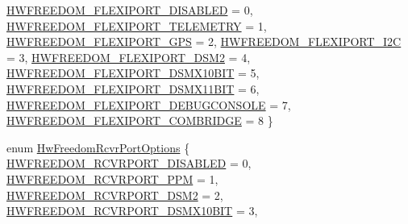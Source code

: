 \begin{DoxyCompactItemize}
\hyperlink{group___hw_freedom_gga2869a644abdac09041a699813c2d8b09a059273b4c9c6fab451bcdbe4fcef17fd}{\-H\-W\-F\-R\-E\-E\-D\-O\-M\-\_\-\-F\-L\-E\-X\-I\-P\-O\-R\-T\-\_\-\-D\-I\-S\-A\-B\-L\-E\-D} = 0, 
\hyperlink{group___hw_freedom_gga2869a644abdac09041a699813c2d8b09ae4f26a63e2e69003aa18fdfd7e00c142}{\-H\-W\-F\-R\-E\-E\-D\-O\-M\-\_\-\-F\-L\-E\-X\-I\-P\-O\-R\-T\-\_\-\-T\-E\-L\-E\-M\-E\-T\-R\-Y} = 1, 
\hyperlink{group___hw_freedom_gga2869a644abdac09041a699813c2d8b09afbd69b8c9f2e2ea8b0ee772e5e749a7c}{\-H\-W\-F\-R\-E\-E\-D\-O\-M\-\_\-\-F\-L\-E\-X\-I\-P\-O\-R\-T\-\_\-\-G\-P\-S} = 2, 
\hyperlink{group___hw_freedom_gga2869a644abdac09041a699813c2d8b09a467c64c346cb5d616588010dafdfcd22}{\-H\-W\-F\-R\-E\-E\-D\-O\-M\-\_\-\-F\-L\-E\-X\-I\-P\-O\-R\-T\-\_\-\-I2\-C} = 3, 
\*
\hyperlink{group___hw_freedom_gga2869a644abdac09041a699813c2d8b09a4656c066e85adac46c8595060fc875ae}{\-H\-W\-F\-R\-E\-E\-D\-O\-M\-\_\-\-F\-L\-E\-X\-I\-P\-O\-R\-T\-\_\-\-D\-S\-M2} = 4, 
\hyperlink{group___hw_freedom_gga2869a644abdac09041a699813c2d8b09abda8d4d72123d2b4d5dd4cec74964c2c}{\-H\-W\-F\-R\-E\-E\-D\-O\-M\-\_\-\-F\-L\-E\-X\-I\-P\-O\-R\-T\-\_\-\-D\-S\-M\-X10\-B\-I\-T} = 5, 
\hyperlink{group___hw_freedom_gga2869a644abdac09041a699813c2d8b09ad275590aaf652703348953bc145cf699}{\-H\-W\-F\-R\-E\-E\-D\-O\-M\-\_\-\-F\-L\-E\-X\-I\-P\-O\-R\-T\-\_\-\-D\-S\-M\-X11\-B\-I\-T} = 6, 
\hyperlink{group___hw_freedom_gga2869a644abdac09041a699813c2d8b09a96b6b4105064a7ad5461750bad331377}{\-H\-W\-F\-R\-E\-E\-D\-O\-M\-\_\-\-F\-L\-E\-X\-I\-P\-O\-R\-T\-\_\-\-D\-E\-B\-U\-G\-C\-O\-N\-S\-O\-L\-E} = 7, 
\*
\hyperlink{group___hw_freedom_gga2869a644abdac09041a699813c2d8b09a04fdebf032150727ae91e04d97b46a09}{\-H\-W\-F\-R\-E\-E\-D\-O\-M\-\_\-\-F\-L\-E\-X\-I\-P\-O\-R\-T\-\_\-\-C\-O\-M\-B\-R\-I\-D\-G\-E} = 8
 \}
\item 
enum \hyperlink{group___hw_freedom_ga0e70961831663131044f95fc0a467396}{\-Hw\-Freedom\-Rcvr\-Port\-Options} \{ \*
\hyperlink{group___hw_freedom_gga0e70961831663131044f95fc0a467396aca3cd0e6e8d2feca5b4d9b50ffe70341}{\-H\-W\-F\-R\-E\-E\-D\-O\-M\-\_\-\-R\-C\-V\-R\-P\-O\-R\-T\-\_\-\-D\-I\-S\-A\-B\-L\-E\-D} = 0, 
\hyperlink{group___hw_freedom_gga0e70961831663131044f95fc0a467396a1621dbf108a95497a5e97629bbcc2058}{\-H\-W\-F\-R\-E\-E\-D\-O\-M\-\_\-\-R\-C\-V\-R\-P\-O\-R\-T\-\_\-\-P\-P\-M} = 1, 
\hyperlink{group___hw_freedom_gga0e70961831663131044f95fc0a467396ae7bfe04cb93488d1e6eb6a5d04f1d625}{\-H\-W\-F\-R\-E\-E\-D\-O\-M\-\_\-\-R\-C\-V\-R\-P\-O\-R\-T\-\_\-\-D\-S\-M2} = 2, 
\hyperlink{group___hw_freedom_gga0e70961831663131044f95fc0a467396ac8fa8bec254f608480a7288c52aaba73}{\-H\-W\-F\-R\-E\-E\-D\-O\-M\-\_\-\-R\-C\-V\-R\-P\-O\-R\-T\-\_\-\-D\-S\-M\-X10\-B\-I\-T} = 3, 

\end{DoxyCompactItemize}

